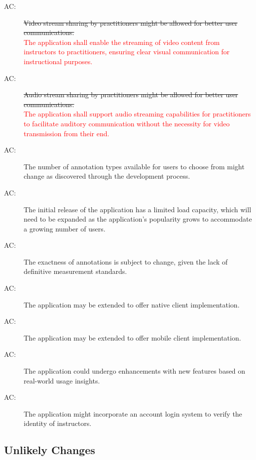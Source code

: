 \documentclass[12pt, titlepage]{article}
\newcommand{\rt}[1]{\textcolor{red}{#1}}
\newcounter{acnum}
\newcommand{\actheacnum}{AC\theacnum}
\begin{document}
\begin{description}
\item[ \actheacnum :] \sout{Video stream sharing by practitioners might be allowed for better user communications.}\\
\rt{The application shall enable the streaming of video content from instructors to practitioners, ensuring clear visual communication for instructional purposes.}
\item[ \actheacnum :] \sout{Audio stream sharing by practitioners might be allowed for better user communications.}\\
\rt{The application shall support audio streaming capabilities for practitioners to facilitate auditory communication without the necessity for video transmission from their end.}
\item[ \actheacnum :] The number of annotation types available for users to choose from might change as discovered through the development process.

\item[ \actheacnum :] The initial release of the application has a limited load capacity, which will need to be expanded as the application's popularity grows to accommodate a growing number of users.

\item[ \actheacnum :] The exactness of annotations is subject to change, given the lack of definitive measurement standards.

\item[ \actheacnum :] The application may be extended to offer native client implementation.

\item[ \actheacnum :] The application may be extended to offer mobile client implementation.
\item[ \actheacnum :] The application could undergo enhancements with new features based on real-world usage insights.
\item[ \actheacnum :] The application might incorporate an account login system to verify the identity of instructors.
\end{description}

\subsection{Unlikely Changes} \label{SecUchange}
\end{document}
